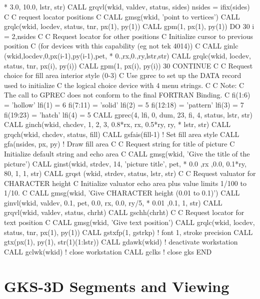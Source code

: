 \begin{XMP}
     *            3.0, 10.0, lstr, str)
      CALL grqvl(wkid, valdev, status, sides)
      nsides = ifix(sides)
C
C     request locator positions
C
      CALL gmsg(wkid, 'point to vertices')
      CALL grqlc(wkid, locdev, status, tnr, px(1), py(1))
      CALL gpm(1, px(1), py(1))
      DO 30 i = 2,nsides
C
C        Request locator for other positions
C        Initialize cursor to previous position
C        (for devices with this capability (eg not tek 4014))
C
         CALL ginlc (wkid,locdev,0,px(i-1),py(i-1),pet,
     *      0.,rx,0.,ry,lstr,str)
         CALL grqlc(wkid, locdev, status, tnr, px(i), py(i))
         CALL gpm(1, px(i), py(i))
30    CONTINUE
C
C     Request choice for fill area interior style (0-3)
C     Use gprec to set up the DATA record used to initialize
C     the logical choice device with 4 menu strings.
C
C     Note:
C     The call to GPREC does not conform to the final FORTRAN Binding.
C
      fi(1:6)   = 'hollow'
      lfi(1)    = 6
      fi(7:11)  = 'solid'
      lfi(2)    = 5
      fi(12:18) = 'pattern'
      lfi(3)    = 7
      fi(19:23) = 'hatch'
      lfi(4)    = 5
      CALL gprec(4, lfi, 0, dum, 23, fi, 4, status, lstr, str)
      CALL ginch(wkid, chcdev, 1, 2, 3, 0.8*rx, rx, 0.5*ry, ry,
     *           lstr, str)
      CALL grqch(wkid, chcdev, status, fill)
      CALL gsfais(fill-1)             ! Set fill area style
      CALL gfa(nsides, px, py)        ! Draw fill area
C
C     Request string for title of picture
C     Initialize default string and echo area
C
      CALL gmsg(wkid, 'Give the title of the picture')
      CALL ginst(wkid, strdev, 14, 'picture title', pet,
     *            0.0 ,rx ,0.0, 0.1*ry, 80, 1, 1, str)
      CALL grqst (wkid, strdev, status, lstr, str)
C
C     Request valuator for CHARACTER height
C     Initialize valuator echo area plus value limits 1/100 to 1/10.
C
      CALL gmsg(wkid, 'Give CHARACTER height (0.01 to 0.1)')
      CALL ginvl(wkid, valdev, 0.1, pet, 0.0, rx, 0.0, ry/5,
     *           0.01 ,0.1, 1, str)
      CALL grqvl(wkid, valdev, status, chrht)
      CALL gschh(chrht)
C
C     Request locator for text position
C
      CALL gmsg(wkid, 'Give text position')
      CALL grqlc(wkid, locdev, status, tnr, px(1), py(1))
      CALL gstxfp(1, gstrkp)          ! font 1, stroke precision
      CALL gtx(px(1), py(1), str(1)(1:lstr))
      CALL gdawk(wkid)                ! deactivate workstation
      CALL gclwk(wkid)                ! close workstation
      CALL gclks                      ! close gks
      END
\end{XMP}
\section{\protect\label{sec:ex3dv}GKS-3D Segments and Viewing}
 
